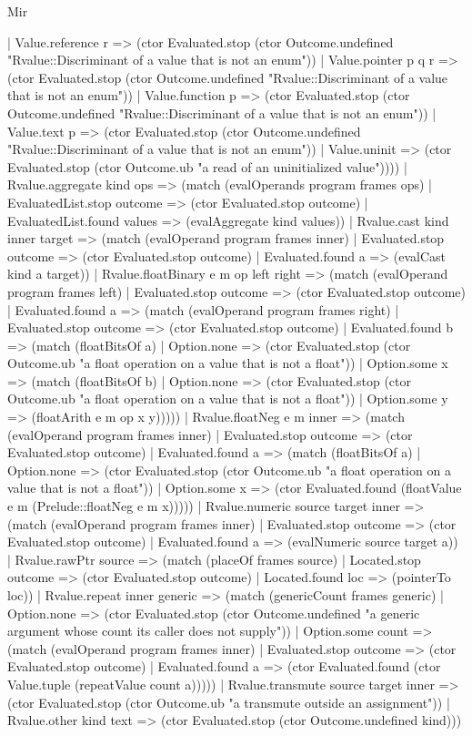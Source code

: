 \begin{lexlean}{Mir}
\begin{semanticmodule}
{        | Value.reference r => (ctor Evaluated.stop (ctor Outcome.undefined "Rvalue::Discriminant of a value that is not an enum"))
        | Value.pointer p q r => (ctor Evaluated.stop (ctor Outcome.undefined "Rvalue::Discriminant of a value that is not an enum"))
        | Value.function p => (ctor Evaluated.stop (ctor Outcome.undefined "Rvalue::Discriminant of a value that is not an enum"))
        | Value.text p => (ctor Evaluated.stop (ctor Outcome.undefined "Rvalue::Discriminant of a value that is not an enum"))
        | Value.uninit => (ctor Evaluated.stop (ctor Outcome.ub "a read of an uninitialized value"))))
    | Rvalue.aggregate kind ops => (match (evalOperands program frames ops)
      | EvaluatedList.stop outcome => (ctor Evaluated.stop outcome)
      | EvaluatedList.found values => (evalAggregate kind values))
    | Rvalue.cast kind inner target => (match (evalOperand program frames inner)
      | Evaluated.stop outcome => (ctor Evaluated.stop outcome)
      | Evaluated.found a => (evalCast kind a target))
    | Rvalue.floatBinary e m op left right => (match (evalOperand program frames left)
      | Evaluated.stop outcome => (ctor Evaluated.stop outcome)
      | Evaluated.found a => (match (evalOperand program frames right)
        | Evaluated.stop outcome => (ctor Evaluated.stop outcome)
        | Evaluated.found b => (match (floatBitsOf a)
          | Option.none => (ctor Evaluated.stop (ctor Outcome.ub "a float operation on a value that is not a float"))
          | Option.some x => (match (floatBitsOf b)
            | Option.none => (ctor Evaluated.stop (ctor Outcome.ub "a float operation on a value that is not a float"))
            | Option.some y => (floatArith e m op x y)))))
    | Rvalue.floatNeg e m inner => (match (evalOperand program frames inner)
      | Evaluated.stop outcome => (ctor Evaluated.stop outcome)
      | Evaluated.found a => (match (floatBitsOf a)
        | Option.none => (ctor Evaluated.stop (ctor Outcome.ub "a float operation on a value that is not a float"))
        | Option.some x => (ctor Evaluated.found (floatValue e m (Prelude::floatNeg e m x)))))
    | Rvalue.numeric source target inner => (match (evalOperand program frames inner)
      | Evaluated.stop outcome => (ctor Evaluated.stop outcome)
      | Evaluated.found a => (evalNumeric source target a))
    | Rvalue.rawPtr source => (match (placeOf frames source)
      | Located.stop outcome => (ctor Evaluated.stop outcome)
      | Located.found loc => (pointerTo loc))
    | Rvalue.repeat inner generic => (match (genericCount frames generic)
      | Option.none => (ctor Evaluated.stop (ctor Outcome.undefined "a generic argument whose count its caller does not supply"))
      | Option.some count => (match (evalOperand program frames inner)
        | Evaluated.stop outcome => (ctor Evaluated.stop outcome)
        | Evaluated.found a => (ctor Evaluated.found (ctor Value.tuple (repeatValue count a)))))
    | Rvalue.transmute source target inner => (ctor Evaluated.stop (ctor Outcome.ub "a transmute outside an assignment"))
    | Rvalue.other kind text => (ctor Evaluated.stop (ctor Outcome.undefined kind)))
}


\end{semanticmodule}
\end{lexlean}
